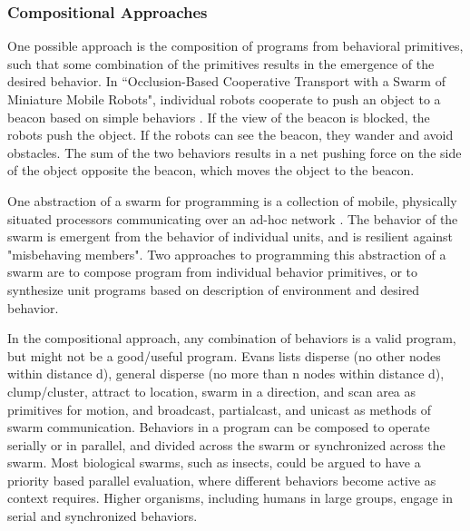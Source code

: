 \documentclass[]{article}
\begin{document}
\subsubsection{Compositional Approaches}

One possible approach is the composition of programs from behavioral primitives, such that some combination of the primitives results in the emergence of the desired behavior. 
In ``Occlusion-Based Cooperative Transport with a Swarm of Miniature Mobile Robots", individual robots cooperate to push an object to a beacon based on simple behaviors \cite{chen2015occlusion}. 
If the view of the beacon is blocked, the robots push the object. 
If the robots can see the beacon, they wander and avoid obstacles. 
The sum of the two behaviors results in a net pushing force on the side of the object opposite the beacon, which moves the object to the beacon. 

One abstraction of a swarm for programming is a collection of mobile, physically situated processors communicating over an ad-hoc network \cite{evans2000programming}. The behavior of the swarm is emergent from the behavior of individual units, and is resilient against "misbehaving members".
Two approaches to programming this abstraction of a swarm are to compose program from individual behavior primitives, or to synthesize unit programs based on description of environment and desired behavior. 

In the compositional approach, any combination of behaviors is a valid program, but might not be a good/useful program. 
Evans lists disperse (no other nodes within distance d), general disperse (no more than n nodes within distance d), clump/cluster, attract to location, swarm in a direction, and scan area as primitives for motion, and broadcast, partialcast, and unicast as methods of swarm communication.
Behaviors in a program can be composed to operate serially or in parallel, and divided across the swarm or synchronized across the swarm. 
Most biological swarms, such as insects, could be argued to have a priority based parallel evaluation, where different behaviors become active as context requires.
Higher organisms, including humans in large groups, engage in serial and synchronized behaviors. %
\end{document}

